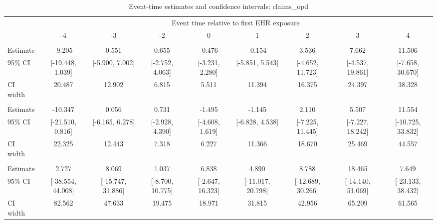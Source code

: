 
\begin{landscape}\begin{table}[!h]
\centering
\caption{\label{tab:ci_claims_opd}Event-time estimates and confidence intervals: claims_opd}
\centering
\fontsize{9}{11}\selectfont
\begin{tabular}[t]{lcccccccc}
\toprule
\multicolumn{1}{c}{ } & \multicolumn{8}{c}{Event time relative to first EHR exposure} \\
\cmidrule(l{3pt}r{3pt}){2-9}
 & -4 & -3 & -2 & 0 & 1 & 2 & 3 & 4\\
\midrule
\addlinespace[0.3em]
\multicolumn{9}{l}{\textbf{All}}\\
\hspace{1em}Estimate & -9.205 & 0.551 & 0.655 & -0.476 & -0.154 & 3.536 & 7.662 & 11.506\\
\hspace{1em}95\% CI & {}[-19.448, 1.039] & {}[-5.900, 7.002] & {}[-2.752, 4.063] & {}[-3.231, 2.280] & {}[-5.851, 5.543] & {}[-4.652, 11.723] & {}[-4.537, 19.861] & {}[-7.658, 30.670]\\
\hspace{1em}CI width & 20.487 & 12.902 & 6.815 & 5.511 & 11.394 & 16.375 & 24.397 & 38.328\\
\addlinespace[0.3em]
\multicolumn{9}{l}{\textbf{Age $\leq$ 60}}\\
\hspace{1em}Estimate & -10.347 & 0.056 & 0.731 & -1.495 & -1.145 & 2.110 & 5.507 & 11.554\\
\hspace{1em}95\% CI & {}[-21.510, 0.816] & {}[-6.165, 6.278] & {}[-2.928, 4.390] & {}[-4.608, 1.619] & {}[-6.828, 4.538] & {}[-7.225, 11.445] & {}[-7.227, 18.242] & {}[-10.725, 33.832]\\
\hspace{1em}CI width & 22.325 & 12.443 & 7.318 & 6.227 & 11.366 & 18.670 & 25.469 & 44.557\\
\addlinespace[0.3em]
\multicolumn{9}{l}{\textbf{Age $\geq$ 60}}\\
\hspace{1em}Estimate & 2.727 & 8.069 & 1.037 & 6.838 & 4.890 & 8.788 & 18.465 & 7.649\\
\hspace{1em}95\% CI & {}[-38.554, 44.008] & {}[-15.747, 31.886] & {}[-8.700, 10.775] & {}[-2.647, 16.323] & {}[-11.017, 20.798] & {}[-12.689, 30.266] & {}[-14.140, 51.069] & {}[-23.133, 38.432]\\
\hspace{1em}CI width & 82.562 & 47.633 & 19.475 & 18.971 & 31.815 & 42.956 & 65.209 & 61.565\\
\bottomrule
\end{tabular}
\end{table}
\end{landscape}
